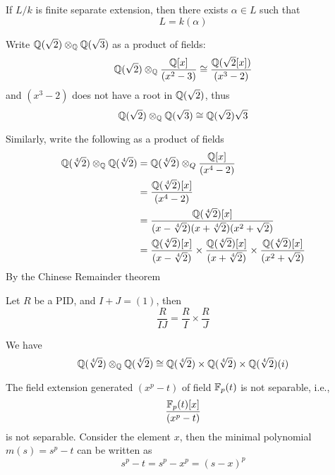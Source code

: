 \begin{prop}
    If $L/k$ is finite separate extension, then there exists $\alpha\in L$ such that 
    \begin{equation*}
        L=k(\alpha)
    \end{equation*}
\end{prop}
\begin{example}
    Write $\mathbb{Q}(\sqrt{2})\otimes_{\mathbb{Q}}\mathbb{Q}(\sqrt{3})$ as a product of fields: 
    \begin{equation*}
        \mathbb{Q}(\sqrt{2})\otimes_{\mathbb{Q}}\frac{\mathbb{Q}[x]}{(x^2-3)}\cong\frac{\mathbb{Q}(\sqrt{2}[x])}{(x^3-2)}
    \end{equation*}
    and $(x^3-2)$ does not have a root in $\mathbb{Q}(\sqrt{2})$, thus 
    \begin{equation*}
        \mathbb{Q}(\sqrt{2})\otimes_{\mathbb{Q}}\mathbb{Q}(\sqrt{3})\cong\mathbb{Q}(\sqrt{2})\sqrt{3}
    \end{equation*}
\end{example}

\begin{example}
    Similarly, write the following as a product of fields
    \begin{align*}
        \mathbb{Q}(\sqrt[4]{2})\otimes_{\mathbb{Q}}\mathbb{Q}(\sqrt[4]{2})&=\mathbb{Q}(\sqrt[4]{2})\otimes_Q\frac{\mathbb{Q}[x]}{(x^4-2)}\\
        &=\frac{\mathbb{Q}(\sqrt[4]{2})[x]}{(x^4-2)}\\
        &=\frac{\mathbb{Q}(\sqrt[4]{2})[x]}{(x-\sqrt[4]{2})(x+\sqrt[4]{2})(x^2+\sqrt{2})}\\
        &=\frac{\mathbb{Q}(\sqrt[4]{2})[x]}{(x-\sqrt[4]{2})}\times\frac{\mathbb{Q}(\sqrt[4]{2})[x]}{(x+\sqrt[4]{2})}\times \frac{\mathbb{Q}(\sqrt[4]{2})[x]}{(x^2+\sqrt{2})}
    \end{align*}
    By the Chinese Remainder theorem 
    \begin{lem}[CRT]
        Let $R$ be a PID, and $I+J=(1)$, then 
        \begin{equation*}
            \frac{R}{IJ}=\frac{R}{I}\times\frac{R}{J}
        \end{equation*}
    \end{lem}
    We have 
    \begin{equation*}
        \mathbb{Q}(\sqrt[4]{2})\otimes_{\mathbb{Q}}\mathbb{Q}(\sqrt[4]{2})\cong \mathbb{Q}(\sqrt[4]{2})\times \mathbb{Q}(\sqrt[4]{2})\times \mathbb{Q}(\sqrt[4]{2})(i)
    \end{equation*}
\end{example}


\begin{example}
    The field extension generated $(x^p-t)$ of field $\mathbb{F}_p(t)$ is not separable, i.e., 
    \begin{equation*}
        \frac{\mathbb{F}_p(t)[x]}{(x^p-t)}
    \end{equation*}
    is not separable. Consider the element $x$, then the minimal polynomial $m(s)=s^p-t$ can be written as 
    \begin{equation*}
        s^p-t=s^p-x^p=(s-x)^p
    \end{equation*}
\end{example}

